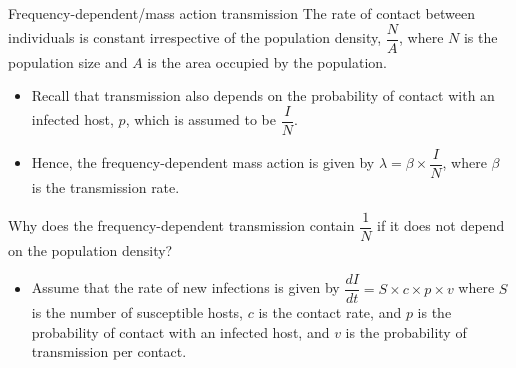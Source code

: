 \documentclass[
  ignorenonframetext,
]{beamer}
\providecommand{\tightlist}{%
  \setlength{\itemsep}{0pt}\setlength{\parskip}{0pt}}\usepackage{longtable,booktabs,array}
\begin{document}
\begin{frame}
\begin{block}{Frequency-dependent/mass action transmission}
\label{frequency-dependentmass-action-transmission}
The rate of contact between individuals is constant irrespective of the
population density, {\(\dfrac{N}{A}\)}, where {\(N\)} is the population
size and {\(A\)} is the area occupied by the population.
\end{block}
\end{frame}

\begin{frame}
\begin{itemize}
\item
  Recall that transmission also depends on the probability of contact
  with an infected host, {\(p\)}, which is assumed to be
  {\(\dfrac{I}{N}\)}.
\item
  Hence, the frequency-dependent mass action is given by
  {\(\lambda = \beta \times \dfrac{I}{N}\)}, where {\(\beta\)} is the
  transmission rate.
\end{itemize}
\end{frame}

\begin{frame}
\begin{tcolorbox}[enhanced jigsaw, colframe=quarto-callout-caution-color-frame, toprule=.15mm, opacitybacktitle=0.6, breakable, colback=white, leftrule=.75mm, left=2mm, opacityback=0, titlerule=0mm, bottomtitle=1mm, toptitle=1mm, title={Question}, bottomrule=.15mm, arc=.35mm, coltitle=black, colbacktitle=quarto-callout-caution-color!10!white, rightrule=.15mm]

Why does the frequency-dependent transmission contain {\(\dfrac{1}{N}\)}
if it does not depend on the population density?

\end{tcolorbox}
\end{frame}

\begin{frame}
\begin{itemize}
\tightlist
\item
  Assume that the rate of new infections is given by
  {\(\dfrac{dI}{dt} = S \times c \times p \times v\)} where {\(S\)} is
  the number of susceptible hosts, {\(c\)} is the contact rate, and
  {\(p\)} is the probability of contact with an infected host, and
  {\(v\)} is the probability of transmission per contact.
\end{itemize}
\end{frame}
\end{document}
